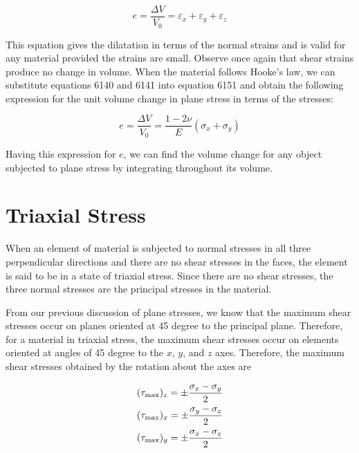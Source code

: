 \documentclass[
10pt,
a4paper,
openany,
svgnames,
]{book} %
\begin{document}
\begin{equation} \label{eqn: 2d dilatation}
  e = \frac{\Delta V}{V_0} = \varepsilon_x + \varepsilon_y + \varepsilon_z
\end{equation}

This equation gives the dilatation in terms of the normal strains and is valid for any material provided the strains are small. Observe once again that shear strains produce no change in volume. When the material follows Hooke’s law, we can substitute equations 6140 and 6141 into equation 6151 and obtain the following expression for the unit volume change in plane stress in terms of the stresses:

\begin{equation}
  e = \frac{\Delta V}{V_0} = \frac{1 - 2\nu}{E}(\sigma_x + \sigma_y)
\end{equation}
  
Having this expression for $e$, we can find the volume change for any object subjected to plane stress by integrating throughout its volume.

\section{Triaxial Stress}

When an element of material is subjected to normal stresses in all three perpendicular directions and there are no shear stresses in the faces, the element is said to be in a state of triaxial stress. Since there are no shear stresses, the three normal stresses are the principal stresses in the material.

From our previous discussion of plane stresses, we know that the maximum shear stresses occur on planes oriented at 45 degree to the principal plane. Therefore, for a material in triaxial stress, the maximum shear stresses occur on elements oriented at angles of 45 degree to the $x$, $y$, and $z$ axes. Therefore, the maximum shear stresses obtained by the rotation about the axes are

\begin{equation}
  \begin{gathered}
    (\tau_{\max })_z =  \pm \frac{\sigma_x - \sigma_y}{2} \hfill \\
    (\tau_{\max })_x =  \pm \frac{\sigma_y - \sigma_z}{2} \hfill \\
    (\tau_{\max })_y =  \pm \frac{\sigma_x - \sigma_z}{2} \hfill \\ 
  \end{gathered}
\end{equation}
\end{document}
